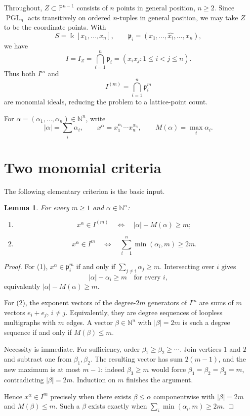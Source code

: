 \documentclass[11pt]{article}
\newtheorem{lemma}[theorem]{Lemma}
\newcommand{\PP}{\mathbb P}
\newcommand{\NN}{\mathbb N}
\newcommand{\p}{\mathfrak p}
\begin{document}
Throughout, \(Z\subset \PP^{n-1}\) consists of \(n\) points in general
position, \(n\ge 2\).  Since \(\operatorname{PGL}_n\) acts transitively
on ordered \(n\)-tuples in general position, we may take \(Z\) to be
the coordinate points.  With
\[
  S=\Bbbk[x_1,\ldots,x_n],
  \qquad
  \p_i=(x_1,\ldots,\widehat{x_i},\ldots,x_n),
\]
we have
\[
 I=I_Z=\bigcap_{i=1}^n \p_i
   =(x_ix_j:1\le i<j\le n).
\]
Thus both \(I^m\) and
\[
 I^{(m)}=\bigcap_{i=1}^n \p_i^m
\]
are monomial ideals, reducing the problem to a lattice-point count.

For \(\alpha=(\alpha_1,\ldots,\alpha_n)\in\NN^n\), write
\[
 |\alpha|=\sum_i\alpha_i,
 \qquad
 x^\alpha=x_1^{\alpha_1}\cdots x_n^{\alpha_n},
 \qquad
 M(\alpha)=\max_i\alpha_i.
\]

\section{Two monomial criteria}

The following elementary criterion is the basic input.

\begin{lemma}\label{lem:criteria}
For every \(m\ge1\) and \(\alpha\in\NN^n\):
\begin{enumerate}%
\item
\[
 x^\alpha\in I^{(m)}
 \quad\Longleftrightarrow\quad
 |\alpha|-M(\alpha)\ge m;
\]
\item
\[
 x^\alpha\in I^m
 \quad\Longleftrightarrow\quad
 \sum_{i=1}^n\min(\alpha_i,m)\ge 2m.
\]
\end{enumerate}
\end{lemma}

\begin{proof}
For (1), \(x^\alpha\in\p_i^m\) if and only if
\(\sum_{j\ne i}\alpha_j\ge m\).  Intersecting over \(i\) gives
\[
 |\alpha|-\alpha_i\ge m\quad\text{for every }i,
\]
equivalently \(|\alpha|-M(\alpha)\ge m\).

For (2), the exponent vectors of the degree-\(2m\) generators of
\(I^m\) are sums of \(m\) vectors \(e_i+e_j\), \(i\ne j\).  Equivalently,
they are degree sequences of loopless multigraphs with \(m\) edges.
A vector \(\beta\in\NN^n\) with \(|\beta|=2m\) is such a degree
sequence if and only if \(M(\beta)\le m\).

Necessity is immediate.  For sufficiency, order
\(\beta_1\ge\beta_2\ge\cdots\).  Join vertices \(1\) and \(2\) and
subtract one from \(\beta_1,\beta_2\).  The resulting vector has sum
\(2(m-1)\), and the new maximum is at most \(m-1\): indeed
\(\beta_3\ge m\) would force
\(\beta_1=\beta_2=\beta_3=m\), contradicting
\(|\beta|=2m\).  Induction on \(m\) finishes the argument.

Hence \(x^\alpha\in I^m\) precisely when there exists
\(\beta\le\alpha\) componentwise with \(|\beta|=2m\) and
\(M(\beta)\le m\).  Such a \(\beta\) exists exactly when
\(\sum_i\min(\alpha_i,m)\ge2m\).
\end{proof}
\end{document}
